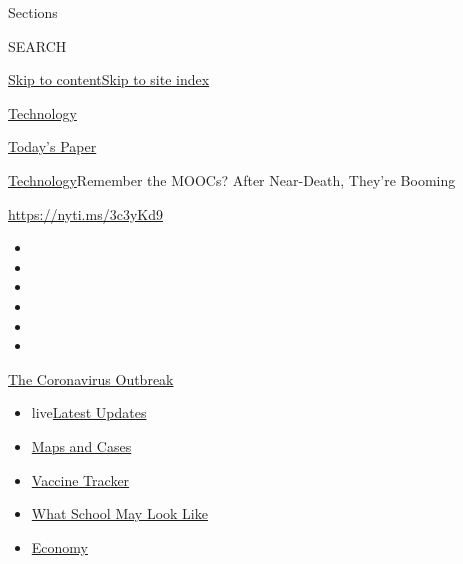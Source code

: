Sections

SEARCH

\protect\hyperlink{site-content}{Skip to
content}\protect\hyperlink{site-index}{Skip to site index}

\href{https://www.nytimes.com/section/technology}{Technology}

\href{https://myaccount.nytimes.com/auth/login?response_type=cookie\&client_id=vi}{}

\href{https://www.nytimes.com/section/todayspaper}{Today's Paper}

\href{/section/technology}{Technology}\textbar{}Remember the MOOCs?
After Near-Death, They're Booming

\url{https://nyti.ms/3c3yKd9}

\begin{itemize}
\item
\item
\item
\item
\item
\item
\end{itemize}

\href{https://www.nytimes.com/news-event/coronavirus?action=click\&pgtype=Article\&state=default\&region=TOP_BANNER\&context=storylines_menu}{The
Coronavirus Outbreak}

\begin{itemize}
\tightlist
\item
  live\href{https://www.nytimes.com/2020/08/01/world/coronavirus-covid-19.html?action=click\&pgtype=Article\&state=default\&region=TOP_BANNER\&context=storylines_menu}{Latest
  Updates}
\item
  \href{https://www.nytimes.com/interactive/2020/us/coronavirus-us-cases.html?action=click\&pgtype=Article\&state=default\&region=TOP_BANNER\&context=storylines_menu}{Maps
  and Cases}
\item
  \href{https://www.nytimes.com/interactive/2020/science/coronavirus-vaccine-tracker.html?action=click\&pgtype=Article\&state=default\&region=TOP_BANNER\&context=storylines_menu}{Vaccine
  Tracker}
\item
  \href{https://www.nytimes.com/interactive/2020/07/29/us/schools-reopening-coronavirus.html?action=click\&pgtype=Article\&state=default\&region=TOP_BANNER\&context=storylines_menu}{What
  School May Look Like}
\item
  \href{https://www.nytimes.com/live/2020/07/31/business/stock-market-today-coronavirus?action=click\&pgtype=Article\&state=default\&region=TOP_BANNER\&context=storylines_menu}{Economy}
\end{itemize}

